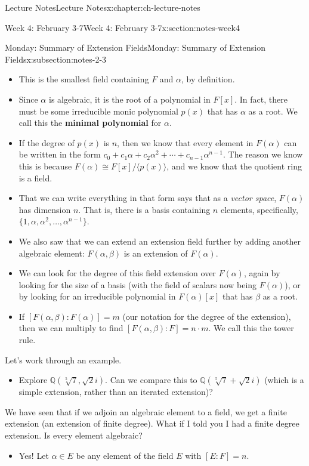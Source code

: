 \documentclass[oneside,11pt,]{book}
\newcommand{\terminology}[1]{\textbf{#1}}
\newcommand{\Q}{\mathbb{Q}}
\begin{document}
\begin{chapterptx}{Lecture Notes}{}{Lecture Notes}{}{}{x:chapter:ch-lecture-notes}
\begin{sectionptx}{Week 4: February 3-7}{}{Week 4: February 3-7}{}{}{x:section:notes-week4}
\begin{subsectionptx}{Monday: Summary of Extension Fields}{}{Monday: Summary of Extension Fields}{}{}{x:subsection:notes-2-3}
\begin{itemize}[label=\textbullet]
\item{}This is the smallest field containing \(F\) and \(\alpha\), by definition.%
\item{}Since \(\alpha\) is algebraic, it is the root of a polynomial in \(F[x]\).  In fact, there must be some irreducible monic polynomial \(p(x)\) that has \(\alpha\) as a root.  We call this the \terminology{minimal polynomial} for \(\alpha\).%
\item{}If the degree of \(p(x)\) is \(n\), then we know that every element in \(F(\alpha)\) can be written in the form \(c_0 + c_1\alpha + c_2 \alpha^2 + \cdots + c_{n-1}\alpha^{n-1}\).  The reason we know this is because \(F(\alpha) \cong F[x]/\langle p(x) \rangle\), and we know that the quotient ring is a field.%
\item{}That we can write everything in that form says that as a \emph{vector space}, \(F(\alpha)\) has dimension \(n\).  That is, there is a basis containing \(n\) elements, specifically, \(\{1, \alpha, \alpha^2, \ldots, \alpha^{n-1}\}\).%
\item{}We also saw that we can extend an extension field further by adding another algebraic element: \(F(\alpha, \beta)\) is an extension of \(F(\alpha)\).%
\item{}We can look for the degree of this field extension over \(F(\alpha)\), again by looking for the size of a basis (with the field of scalars now being \(F(\alpha)\)), or by looking for an irreducible polynomial in \(F(\alpha)[x]\) that has \(\beta\) as a root.%
\item{}If \([F(\alpha,\beta):F(\alpha)] = m\) (our notation for the degree of the extension), then we can multiply to find \([F(\alpha,\beta):F] = n\cdot m\).  We call this the tower rule.%
\end{itemize}
%
\par
Let's work through an example.%
\begin{itemize}[label=\textbullet]
\item{}Explore \(\Q(\sqrt[5]{7}, \sqrt{2}i)\).  Can we compare this to \(\Q(\sqrt[5]{7}+\sqrt{2}i)\) (which is a simple extension, rather than an iterated extension)?%
\end{itemize}
%
\par
We have seen that if we adjoin an algebraic element to a field, we get a finite extension (an extension of finite degree).  What if I told you I had a finite degree extension.  Is every element algebraic?%
\begin{itemize}[label=\textbullet]
\item{}Yes!  Let \(\alpha \in E\) be any element of the field \(E\) with \([E:F] = n\).%

\end{itemize}
\end{subsectionptx}
\end{sectionptx}
\end{chapterptx}
\end{document}
